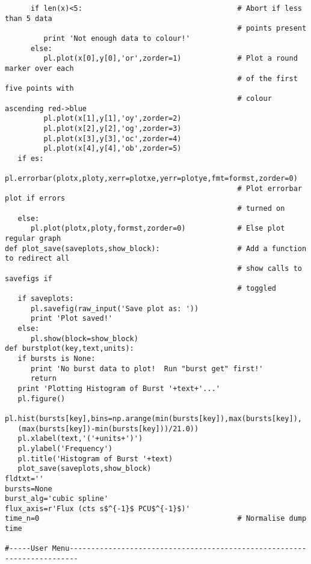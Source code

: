 \begin{verbatim}
      if len(x)<5:                                    # Abort if less than 5 data
                                                      # points present
         print 'Not enough data to colour!'
      else:
         pl.plot(x[0],y[0],'or',zorder=1)             # Plot a round marker over each
                                                      # of the first five points with
                                                      # colour ascending red->blue
         pl.plot(x[1],y[1],'oy',zorder=2)
         pl.plot(x[2],y[2],'og',zorder=3)
         pl.plot(x[3],y[3],'oc',zorder=4)
         pl.plot(x[4],y[4],'ob',zorder=5)
   if es:
      pl.errorbar(plotx,ploty,xerr=plotxe,yerr=plotye,fmt=formst,zorder=0)
                                                      # Plot errorbar plot if errors
                                                      # turned on
   else:
      pl.plot(plotx,ploty,formst,zorder=0)            # Else plot regular graph
def plot_save(saveplots,show_block):                  # Add a function to redirect all
                                                      # show calls to savefigs if
                                                      # toggled
   if saveplots:
      pl.savefig(raw_input('Save plot as: '))
      print 'Plot saved!'
   else:
      pl.show(block=show_block)
def burstplot(key,text,units):
   if bursts is None:
      print 'No burst data to plot!  Run "burst get" first!'
      return
   print 'Plotting Histogram of Burst '+text+'...'
   pl.figure()
   pl.hist(bursts[key],bins=np.arange(min(bursts[key]),max(bursts[key]),
   (max(bursts[key])-min(bursts[key]))/21.0))
   pl.xlabel(text,'('+units+')')
   pl.ylabel('Frequency')
   pl.title('Histogram of Burst '+text)
   plot_save(saveplots,show_block)
fldtxt=''
bursts=None
burst_alg='cubic spline'
flux_axis=r'Flux (cts s$^{-1}$ PCU$^{-1}$)'
time_n=0                                              # Normalise dump time

#-----User Menu------------------------------------------------------------------------


\end{verbatim}

